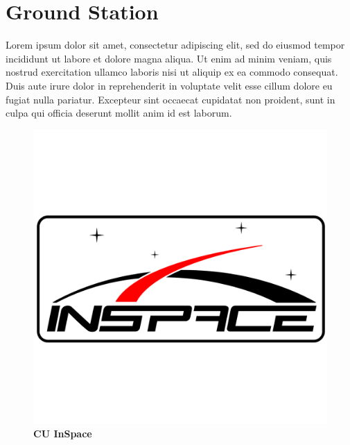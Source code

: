 \sectionfont{\fontsize{14}{14}\selectfont}
\section{Ground Station}




Lorem ipsum dolor sit amet, consectetur adipiscing elit, sed do eiusmod tempor incididunt ut labore et dolore magna aliqua. Ut enim ad minim veniam, quis nostrud exercitation ullamco laboris nisi ut aliquip ex ea commodo consequat. Duis aute irure dolor in reprehenderit in voluptate velit esse cillum dolore eu fugiat nulla pariatur. Excepteur sint occaecat cupidatat non proident, sunt in culpa qui officia deserunt mollit anim id est laborum.

\begin{figure}[ht]
\centering
\includegraphics[width=12cm]{images/cuinspace_logo.png}
\caption{\bf CU InSpace \cite{GPS}}
\label{fig:cu inspace}
\end{figure}
